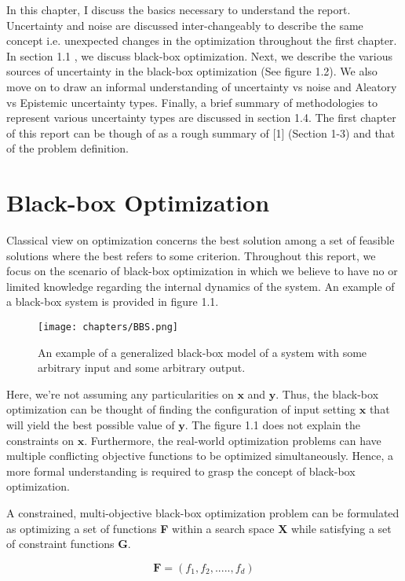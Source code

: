 
In this chapter, I discuss the basics necessary to understand the report. Uncertainty and noise are discussed inter-changeably to describe the same concept i.e. unexpected changes in the optimization throughout the first chapter. In section 1.1 , we discuss black-box optimization. Next, we describe the various sources of uncertainty in the black-box optimization (See figure 1.2). We also move on to draw an informal understanding of uncertainty vs noise and Aleatory vs Epistemic uncertainty types. Finally, a brief summary of methodologies to represent various uncertainty types are discussed in section 1.4. The first chapter of this report can be though of as a rough summary of [1] (Section 1-3) and that of the problem definition.
 
\section{Black-box Optimization}

Classical view on optimization concerns the best solution among a set of feasible solutions where the best refers to some criterion. Throughout this report, we focus on the scenario of black-box optimization in which we believe to have no or limited knowledge regarding the internal dynamics of the system. An example of a black-box system is provided in figure 1.1.

\begin{figure}
\centering
\texttt{[image: chapters/BBS.png]}
\caption{An example of a generalized black-box model of a system with some arbitrary input and some arbitrary output.}
\end{figure}

Here, we're not assuming any particularities on $\textbf{x}$ and $\textbf{y}$. Thus, the black-box optimization can be thought of finding the configuration of input setting $\textbf{x}$ that will yield the best possible value of $\textbf{y}$. The figure 1.1 does not explain the constraints on $\textbf{x}$. Furthermore, the real-world optimization problems can have multiple conflicting objective functions to be optimized simultaneously. Hence, a more formal understanding is required to grasp the concept of black-box optimization. 

A constrained, multi-objective black-box optimization problem can be formulated as optimizing a set of functions \textbf{F} within a search space \textbf{X} while satisfying a set of constraint functions \textbf{G}. 

\begin{equation}
\textbf{F} = ({f}_1,{f}_2,.....,{f}_d) 
\end{equation}

